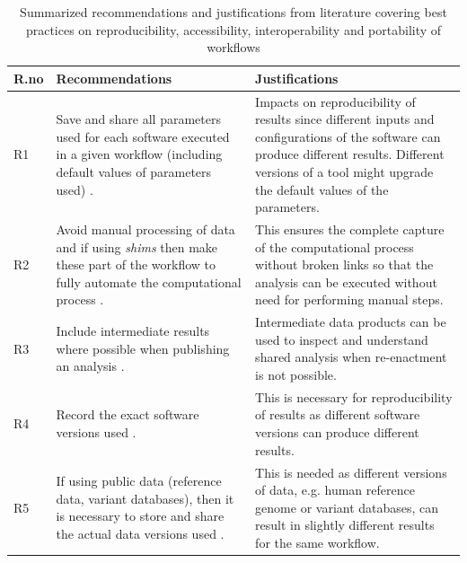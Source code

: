 \documentclass[a4paper,num-refs]{oup-contemporary}
\begin{document}
\begin{table}[!htbp]
\caption{Summarized recommendations and justifications from literature covering best practices on reproducibility, accessibility, interoperability and portability of workflows}\label{tab:recommendation:wide}
\begin{tabularx}{\linewidth}{p{1.4cm} L L}
\toprule
{\textbf{R.no}} & {\textbf{Recommendations}} & {\textbf{Justifications}}\\
\midrule
R1 \newline{} & Save and share all parameters used for each software executed in a given workflow (including default values of parameters used) \citep{Nekrutenko2012, garijo_2013, garijo_2017, sandve_2013}. &  Impacts on reproducibility of results since different inputs and configurations of the software can produce different results. Different versions of a tool might upgrade the default values of the parameters. \\  \midrule
R2 \newline{} & Avoid manual processing of data and if using \textit{shims} \citep{Mohan2014} then make these part of the workflow to fully automate the computational process \citep{Nekrutenko2012, sandve_2013}.    &   This ensures the complete capture of the computational process without broken links so that the analysis can be executed without need for performing manual steps.       \\  \midrule
R3 \newline{} & Include intermediate results where possible when publishing an analysis \citep{garijo_2013, garijo_2017, sandve_2013}. &  Intermediate data products can be used to inspect and understand shared analysis when re-enactment is not possible.    \\  \midrule
R4 \newline{} & Record the exact software versions used  \citep{Nekrutenko2012, sandve_2013}.    &   This is necessary for reproducibility of results as different software versions can produce different results. \\  \midrule 
R5 \newline{} & If using public data (reference data, variant databases), then it is necessary to store and share the actual data versions used \citep{Spjuth2015, kanwal_2017, Nekrutenko2012, sandve_2013} . &   This is needed as different versions of data, e.g. human reference genome or variant databases, can result in slightly different results for the same workflow. \\  \midrule

\end{tabularx}
\end{table}
\end{document}
